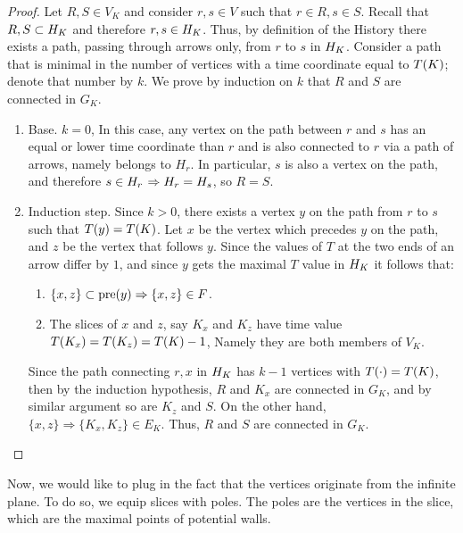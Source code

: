   \begin{proof}
    Let $R, S \in V_{K}$ and consider $r,s \in V$ such that $r \in R, s \in S$. Recall that $R,S \subset H_{K}$ and therefore $r,s \in H_{K}$. Thus, by definition of the History there exists a path, passing through arrows only, from $r$ to $s$ in $H_{K}$.
    Consider a path that is minimal in the number of vertices with a time coordinate equal to $T(K)$; denote that number by $k$. We prove by induction on $k$ that $R$ and $S$ are connected in $G_{K}$.

      \begin{enumerate}
      \item Base. $k=0$, In this case, any vertex on the path between $r$ and $s$ has an equal or lower time coordinate than $r$ and is also connected to $r$ via a path of arrows, namely belongs to $H_{r}$. In particular, $s$ is also a vertex on the path, and therefore $s \in H_{r}$ $\Rightarrow H_{r} = H_{s}$, so $R = S$.
      \item Induction step. Since $k > 0 $, there exists a vertex $y$ on the path from $r$ to $s$ such that $T(y) = T(K)$. Let $x$ be the vertex which precedes $y$ on the path, and $z$ be the vertex that follows $y$. Since the values of $T$ at the two ends of an arrow differ by $1$, and since $y$ gets the maximal $T$ value in $H_{K}$ it follows that: 
        \begin{enumerate}
          \item $\{x,z\} \subset \text{pre}(y) \Rightarrow \{x,z\} \in F$. 
          \item The slices of $x$ and $z$, say $K_{x}$ and $K_{z}$ have time value $T(K_{x}) = T(K_{z}) = T(K) -1$, Namely they are both members of $V_{K}$. 
        \end{enumerate}
        Since the path connecting $r,x$ in $H_{K}$ has $k-1$ vertices with $T(\cdot) = T(K)$, then by the induction hypothesis, $R$ and $K_{x}$ are connected in $G_{K}$, and by similar argument so are $K_{z}$ and $S$. On the other hand, $ \{x,z\} \Rightarrow \{K_{x},K_{z}\} \in E_{K}$. Thus, $R$ and $S$ are connected in $G_{K}$.
    \end{enumerate}
  \end{proof}
  Now, we would like to plug in the fact that the vertices originate from the infinite plane. To do so, we equip slices with poles. The poles are the vertices in the slice, which are the maximal points of potential walls.

